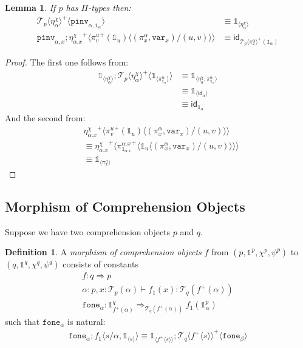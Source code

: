 \documentclass[10pt]{article}
\newtheorem{lemma}{Lemma}
\theoremstyle{definition}
\newtheorem{definition}{Definition}
\newcommand{\yields}{\vdash}
\newcommand{\tcell}{\Rightarrow}
\newcommand{\id}{\mathsf{id}}
\newcommand\TrPlus[2]{\ensuremath{{#1}^+(#2)}}
\newcommand\El[2]{\mathcal{T}_{#1}(#2)}
\newcommand\ApEl[2]{\mathcal{T}_{#1}\langle#2\rangle}
\newcommand\ap[2]{\ensuremath{#1 \langle #2 \rangle }}
\newcommand\ApPlus[2]{\ensuremath{{#1}^+ \langle #2 \rangle }}
\newcommand\One{\ensuremath{\mathds{1}}}
\newcommand\var[1]{\ensuremath{\mathtt{var}_{#1}}}
\newcommand\ApOne[1]{\ensuremath{\One_{\langle {#1} \rangle }}}
\newcommand\pinv[1]{\ensuremath{\mathtt{pinv}_{#1}}}
\newcommand\fone[1]{\ensuremath{\mathtt{fone}_{#1}}}
\begin{document}
\begin{lemma}
If $p$ has $\Pi$-types then:
\begin{align*}
\ApPlus{\ApEl{p}{\eta^\chi_\alpha}}{\pinv{\alpha,\One_\alpha}} &\equiv  \ApOne{\eta^\chi_\alpha} \\
\pinv{\alpha,x};\ApPlus{\eta^\chi_{\alpha.x}}{\ap{\TrPlus{\pi^u_v}{\One_u}}{(\pi^\alpha_x,\var{x})/(u,v)}} &\equiv \id_{\TrPlus{\ApEl{p}{\pi^\alpha_x}}{\One_\alpha}}
\end{align*}
\end{lemma}
\begin{proof}
The first one follows from:
\begin{align*}
\ApOne{\eta^\chi_\alpha} ; \ApPlus{\ApEl{p}{\eta^\chi_\alpha}}{\ApOne{\pi^\alpha_{\One_\alpha}}} 
&\equiv \ApOne{\eta^\chi_\alpha;\pi^\alpha_{\One_\alpha}}  \\
&\equiv \ApOne{\id_\alpha} \\
&\equiv \id_{\One_\alpha}
\end{align*}
And the second from:
\begin{align*}
&\ApPlus{\eta^\chi_{\alpha.x}}{\ap{\TrPlus{\pi^u_v}{\One_u}}{(\pi^\alpha_x,\var{x})/(u,v)}} \\
&\equiv \ApPlus{\eta^\chi_{\alpha.x}}{\ApPlus{\pi^{\alpha.x}_{1_{\alpha.x}}}{\ap{\One_u}{(\pi^\alpha_x,\var{x})/(u,v)}}} \\
&\equiv \ApOne{\pi^\alpha_x}
\end{align*}
\end{proof}

\subsection{Morphism of Comprehension Objects}

Suppose we have two comprehension objects $p$ and $q$.

\begin{definition}\label{def:morphism-comprehension-object}
A \emph{morphism of comprehension objects} $f$ from $(p, \One^p, \chi^p, \psi^p)$ to $(q, \One^q, \chi^q, \psi^q)$ consists of constants
\begin{align*}
f : q \tcell p \\
\alpha : p, x : \El{p}{\alpha} \yields f_1(x) : \El{q}{\TrPlus{f}{\alpha}} \\
\fone{\alpha} : \One^q_{\TrPlus{f}{\alpha}}  \tcell_{\El{q}{\TrPlus{f}{\alpha}}} f_1(\One^p_\alpha)
\end{align*}
such that $\fone{\alpha}$ is natural:
\begin{align}
\fone{\alpha};\ap{f_1}{s/\alpha, \ApOne{s}} \equiv \ApOne{\ApPlus{f}{s}};\ApPlus{\ApEl{q}{\ApPlus{f}{s}}}{\fone{\beta}}
\end{align}
\end{definition}
\end{document}
